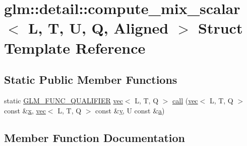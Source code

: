 \hypertarget{structglm_1_1detail_1_1compute__mix__scalar}{}\section{glm\+:\+:detail\+:\+:compute\+\_\+mix\+\_\+scalar$<$ L, T, U, Q, Aligned $>$ Struct Template Reference}
\label{structglm_1_1detail_1_1compute__mix__scalar}
\subsection*{Static Public Member Functions}
\begin{DoxyCompactItemize}
\item 
static \hyperlink{setup_8hpp_a33fdea6f91c5f834105f7415e2a64407}{G\+L\+M\+\_\+\+F\+U\+N\+C\+\_\+\+Q\+U\+A\+L\+I\+F\+I\+ER} \hyperlink{structglm_1_1vec}{vec}$<$ L, T, Q $>$ \hyperlink{structglm_1_1detail_1_1compute__mix__scalar_a5938ae634fdc3c78b143165b19c28b7d}{call} (\hyperlink{structglm_1_1vec}{vec}$<$ L, T, Q $>$ const \&\hyperlink{_s_d_l__opengl_8h_ad0e63d0edcdbd3d79554076bf309fd47}{x}, \hyperlink{structglm_1_1vec}{vec}$<$ L, T, Q $>$ const \&\hyperlink{_s_d_l__opengl_8h_a1675d9d7bb68e1657ff028643b4037e3}{y}, U const \&\hyperlink{_s_d_l__opengl__glext_8h_a3309789fc188587d666cda5ece79cf82}{a})
\end{DoxyCompactItemize}


\subsection{Member Function Documentation}
\mbox{\label{structglm_1_1detail_1_1compute__mix__scalar_a5938ae634fdc3c78b143165b19c28b7d}} 
